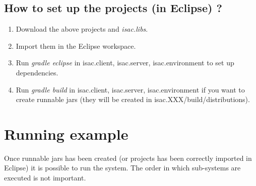 \documentclass[11pt]{article}
\begin{document}
\subsection{How to set up the projects (in Eclipse) ?}
\begin{enumerate}
\item Download the above projects and \emph{isac.libs}.
\item Import them in the Eclipse workspace.
\item Run \emph{gradle eclipse} in isac.client, isac.server, isac.environment to set up dependencies.
\item Run \emph{gradle build} in isac.client, isac.server, isac.environment if you want to create runnable jars (they will be created in isac.XXX/build/distributions).
\end{enumerate}

\section{Running example}
Once runnable jars has been created (or projects has been correctly imported in Eclipse) it is possible to run the system. The order in which sub-systems are executed is not important. 
\end{document}
